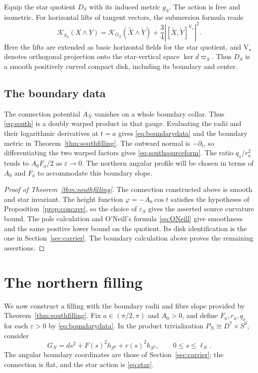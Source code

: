 \documentclass[12pt]{amsart}
\numberwithin{equation}{section}
\theoremstyle{remark}
\newcommand{\eps}{\varepsilon}
\newcommand{\cK}{\mathcal K}
\newcommand{\ver}{\mathrm V}
\begin{document}
Equip the star quotient \(D_S\) with its induced metric \(g_S\).
The action is free and isometric. For horizontal lifts of tangent
vectors, the submersion formula \cite{ON} reads
\begin{equation}\label{eq:ONeill}
\cK_{g_S}(X\wedge Y)
 =\cK_{G_S}(\widetilde X\wedge\widetilde Y)
          +\frac34|[\widetilde X,\widetilde Y]^{\ver_\star}|^2.
\end{equation}
Here the lifts are extended as basic horizontal fields for the star
quotient, and \(\ver_\star\) denotes orthogonal projection onto the
star-vertical space \(\ker d\varpi_S\). Thus \(D_S\) is a smooth positively curved compact disk,
including its boundary and center.

\subsection{The boundary data}
The connection potential \(A_N\) vanishes on a whole boundary
collar. Thus \eqref{eq:south} is a doubly warped product in that
gauge. Evaluating the radii and their logarithmic derivatives at
\(t=a\) gives \eqref{eq:boundarydata} and the boundary metric in
Theorem~\ref{thm:southfilling}. The outward normal is
\(-\partial_t\), so differentiating the two warped factors gives
\eqref{eq:southsourceform}.
The ratio \(q_s/r_a^2\) tends to \(A_0F_a/2\) as
\(\eps\to0\). The northern angular profile will be chosen in terms
of \(A_0\) and \(F_a\) to accommodate this boundary slope.

\begin{proof}[Proof of Theorem~\ref{thm:southfilling}]
The connection constructed above is smooth and star invariant.
The height function \(\varphi=-A_0\cos t\) satisfies the hypotheses
of Proposition~\ref{prop:concave}, so the choice of \(\eps_S\)
gives the asserted source curvature bound. The pole calculation and
O'Neill's formula \eqref{eq:ONeill} give smoothness and the same
positive lower bound on the quotient. Its disk identification is the
one in Section~\ref{sec:carrier}. The boundary calculation above
proves the remaining assertions.
\end{proof}

\section{The northern filling}\label{sec:north}

We now construct a filling with the boundary radii and fibre slope
provided by Theorem~\ref{thm:southfilling}. Fix
\(a\in(\pi/2,\pi)\) and \(A_0>0\), and define \(F_a,r_a,q_s\)
for each \(\eps>0\) by \eqref{eq:boundarydata}.
In the product trivialization \(P_N\cong D^7\times S^3\), consider
\begin{equation}\label{eq:north}
G_N=ds^2+F(s)^2h_{S^6}+r(s)^2h_{S^3},
\qquad 0\le s\le\ell_N.
\end{equation}
The angular boundary coordinates are those of
Section~\ref{sec:carrier}; the connection is flat, and the star
action is \eqref{eq:star}.
\end{document}
